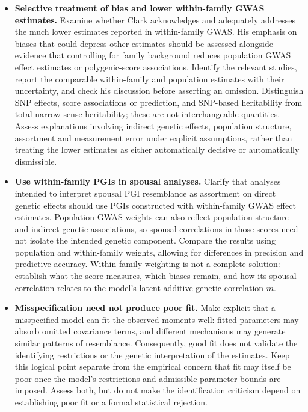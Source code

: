 \begin{itemize}
\item \textbf{Selective treatment of bias and lower within-family GWAS estimates.}
Examine whether Clark acknowledges and adequately addresses the much
lower estimates reported in within-family GWAS. His emphasis on biases
that could depress other estimates should be assessed alongside evidence
that controlling for family background reduces population GWAS effect
estimates or polygenic-score associations. Identify the relevant studies,
report the comparable within-family and population estimates with their
uncertainty, and check his discussion before asserting an omission.
Distinguish SNP effects, score associations or prediction, and SNP-based
heritability from total narrow-sense heritability; these are not
interchangeable quantities. Assess explanations involving indirect
genetic effects, population structure, assortment and measurement error
under explicit assumptions, rather than treating the lower estimates
as either automatically decisive or automatically dismissible.

\item \textbf{Use within-family PGIs in spousal analyses.}
Clarify that analyses intended to interpret spousal PGI resemblance as
assortment on direct genetic effects should use PGIs constructed with
within-family GWAS effect estimates. Population-GWAS weights can also
reflect population structure and indirect genetic associations, so
spousal correlations in those scores need not isolate the intended
genetic component. Compare the results using population and within-family
weights, allowing for differences in precision and predictive accuracy.
Within-family weighting is not a complete solution: establish what the
score measures, which biases remain, and how its spousal correlation
relates to the model's latent additive-genetic correlation $m$.

\item \textbf{Misspecification need not produce poor fit.}
Make explicit that a misspecified model can fit the observed moments
well: fitted parameters may absorb omitted covariance terms, and
different mechanisms may generate similar patterns of resemblance.
Consequently, good fit does not validate the identifying restrictions
or the genetic interpretation of the estimates. Keep this logical point
separate from the empirical concern that fit may itself be poor once
the model's restrictions and admissible parameter bounds are imposed.
Assess both, but do not make the identification criticism depend on
establishing poor fit or a formal statistical rejection.


\end{itemize}
